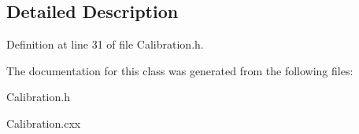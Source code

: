 \subsection{Detailed Description}


Definition at line 31 of file Calibration.h.



The documentation for this class was generated from the following files:\begin{DoxyCompactItemize}
\item 
Calibration.h\item 
Calibration.cxx\end{DoxyCompactItemize}
